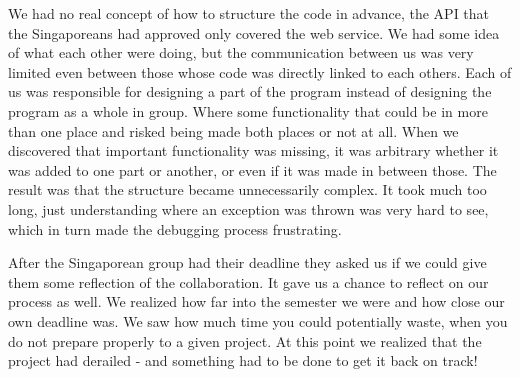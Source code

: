 We had no real concept of how to structure the code in advance, the API that the Singaporeans had approved only covered the web service. We had some idea of what each other were doing, but the communication between us was very limited even between those whose code was directly linked to each others. Each of us was responsible for designing a part of the program instead of designing the program as a whole in group. Where some functionality that could be in more than one place and risked being made both places or not at all. When we discovered that important functionality was missing, it was arbitrary whether it was added to one part or another, or even if it was made in between those. The result was that the structure became unnecessarily complex. It took much too long, just understanding where an exception was thrown was very hard to see, which in turn made the debugging process frustrating.

After the Singaporean group had their deadline they asked us if we could give them some reflection of the collaboration. It gave us a chance to reflect on our process as well. We realized how far into the semester we were and how close our own deadline was. We saw how much time you could potentially waste, when you do not prepare properly to a given project. At this point we realized that the project had derailed - and something had to be done to get it back on track!
\newpage